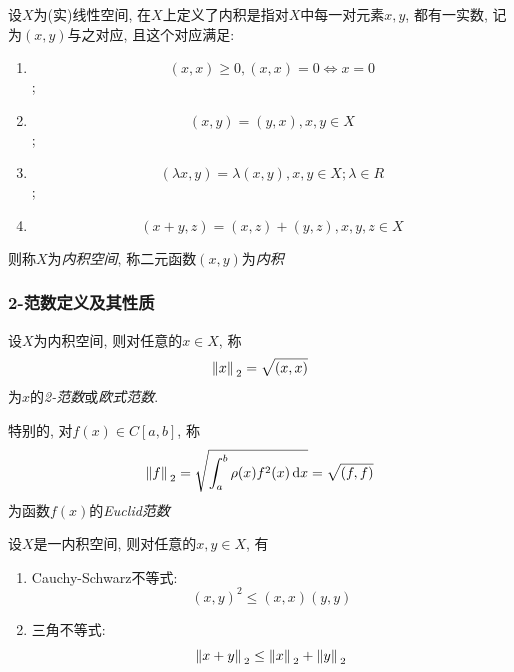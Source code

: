 \begin{definition}[内积空间]
    设$X$为(实)线性空间, 在$X$上定义了内积是指对$X$中每一对元素$x,y$, 都有一实数, 记为$(x,y)$与之对应, 且这个对应满足:
    \begin{enumerate}
        \item \begin{equation*}
            (x,x)\ge0, (x,x)=0\Leftrightarrow x=0
        \end{equation*};
        \item \begin{equation*}
            (x,y)=(y,x),x,y\in X
        \end{equation*};
        \item \begin{equation*}
            (\lambda x,y)=\lambda(x,y), x,y\in X; \lambda\in R
        \end{equation*};
        \item \begin{equation*}
            (x+y,z)=(x,z)+(y,z), x,y,z\in X
        \end{equation*}
    \end{enumerate}
    则称$X$为\emph{内积空间}, 称二元函数$(x,y)$为\emph{内积}
\end{definition}

\subsubsection{2-范数定义及其性质}

\begin{definition}
    设$X$为内积空间, 则对任意的$x\in X$, 称
    \begin{equation*}
        \norm*{x}_2=\sqrt{(x,x)}
    \end{equation*}
    为$x$的\emph{2-范数}或\emph{欧式范数}.

    特别的, 对$f(x)\in C[a,b]$, 称
    \begin{equation*}
        \norm*{f}_2=\sqrt{\int_a^b\rho(x)f^2(x)\dd{x}}=\sqrt{(f,f)}
    \end{equation*}
    为函数$f(x)$的\emph{Euclid范数}
\end{definition}

设$X$是一内积空间, 则对任意的$x,y\in X$, 有
\begin{enumerate}
    \item Cauchy-Schwarz不等式:
    \begin{equation*}
        (x,y)^2\le(x,x)(y,y)
    \end{equation*}
    \item 三角不等式:
    \begin{equation*}
        \norm*{x+y}_2\le\norm*{x}_2+\norm*{y}_2
    \end{equation*}
\end{enumerate}

